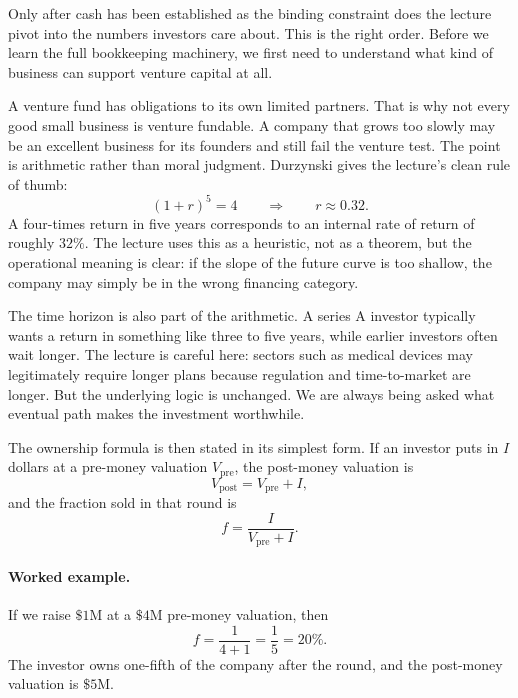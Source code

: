 Only after cash has been established as the binding constraint does the lecture pivot into the numbers investors care about. This is the right order. Before we learn the full bookkeeping machinery, we first need to understand what kind of business can support venture capital at all.

A venture fund has obligations to its own limited partners. That is why not every good small business is venture fundable. A company that grows too slowly may be an excellent business for its founders and still fail the venture test. The point is arithmetic rather than moral judgment. Durzynski gives the lecture's clean rule of thumb:
\begin{equation}
(1+r)^5 = 4
\qquad \Rightarrow \qquad
r \approx 0.32.
\end{equation}
A four-times return in five years corresponds to an internal rate of return of roughly \(32\%\). The lecture uses this as a heuristic, not as a theorem, but the operational meaning is clear: if the slope of the future curve is too shallow, the company may simply be in the wrong financing category.

The time horizon is also part of the arithmetic. A series A investor typically wants a return in something like three to five years, while earlier investors often wait longer. The lecture is careful here: sectors such as medical devices may legitimately require longer plans because regulation and time-to-market are longer. But the underlying logic is unchanged. We are always being asked what eventual path makes the investment worthwhile.

The ownership formula is then stated in its simplest form. If an investor puts in \(I\) dollars at a pre-money valuation \(V_{\mathrm{pre}}\), the post-money valuation is
\begin{equation}
V_{\mathrm{post}} = V_{\mathrm{pre}} + I,
\end{equation}
and the fraction sold in that round is
\begin{equation}
f = \frac{I}{V_{\mathrm{pre}} + I}.
\end{equation}

\paragraph{Worked example.}
If we raise \(\$1\text{M}\) at a \(\$4\text{M}\) pre-money valuation, then
\begin{equation}
f = \frac{1}{4+1} = \frac{1}{5} = 20\%.
\end{equation}
The investor owns one-fifth of the company after the round, and the post-money valuation is \(\$5\text{M}\).

